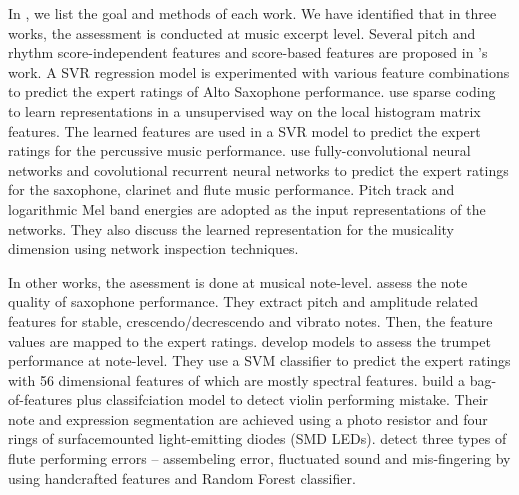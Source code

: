 In , we list the goal and methods of each work. We have identified that in three works, the assessment is conducted at music excerpt level. Several pitch and rhythm score-independent features and score-based features are proposed in 's work. A SVR regression model is experimented with various feature combinations to predict the expert ratings of Alto Saxophone performance.  use sparse coding to learn representations in a unsupervised way on the local histogram matrix features. The learned features are used in a SVR model to predict the expert ratings for the percussive music performance.  use fully-convolutional neural networks and covolutional recurrent neural networks to predict the expert ratings for the saxophone, clarinet and flute music performance. Pitch track and logarithmic Mel band energies are adopted as the input representations of the networks. They also discuss the learned representation for the musicality dimension using network inspection techniques. 

In other works, the asessment is done at musical note-level.  assess the note quality of saxophone performance. They extract pitch and amplitude related features for stable, crescendo/decrescendo and vibrato notes. Then, the feature values are mapped to the expert ratings.  develop models to assess the trumpet performance at note-level. They use a SVM classifier to predict the expert ratings with 56 dimensional features of which are mostly spectral features.  build a bag-of-features plus classifciation model to detect violin performing mistake. Their note and expression segmentation are achieved using a photo resistor and four rings of surfacemounted light-emitting diodes (SMD LEDs).  detect three types of flute performing errors -- assembeling error, fluctuated sound and mis-fingering by using handcrafted features and Random Forest classifier.

